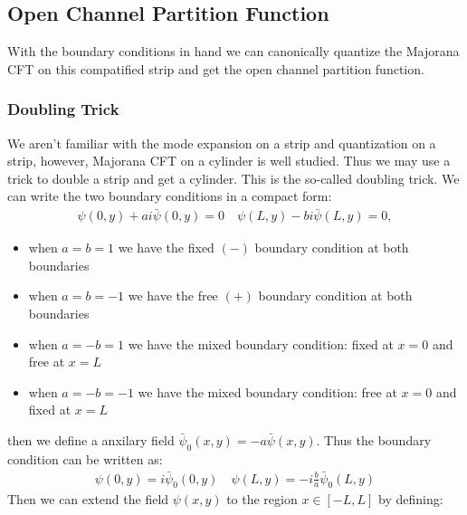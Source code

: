 \subsection{Open Channel Partition Function}

With the boundary conditions in hand we can canonically quantize the Majorana CFT on this compatified strip and get the open channel partition function. 

\subsubsection{Doubling Trick}

We aren't familiar with the mode expansion on a strip and quantization on a strip, however, Majorana CFT on a cylinder is well studied. Thus we may use a trick to double a strip and get a cylinder. This is the so-called doubling trick. 
We can write the two boundary conditions in a compact form:
\begin{align}
  \psi(0,y)+ai\bar{\psi}(0,y)=0\quad \psi(L,y)-bi\bar{\psi}(L,y)=0,
\end{align}
\begin{itemize}
  \item when $ a = b =1 $ we have the fixed $ (-) $ boundary condition at both boundaries
  \item when $ a = b =-1 $ we have the free $ (+) $ boundary condition at both boundaries
  \item when $ a = -b =1 $ we have the mixed boundary condition: fixed at $ x=0 $ and free at $ x=L $
  \item when $ a = -b =-1 $ we have the mixed boundary condition: free at $ x=0 $ and fixed at $ x=L $
\end{itemize}
then we define a anxilary field $ \bar{\psi}_0(x,y) = - a \bar{\psi}(x,y) $. Thus the boundary condition can be written as:
\begin{align}
  \psi(0,y)= i\bar{\psi}_0(0,y)\quad \psi(L,y)= - i \displaystyle\frac{b}{a} \bar{\psi}_0(L,y)
\end{align}
Then we can extend the field $ \psi(x,y) $ to the region $ x \in [-L,L] $ by defining:
